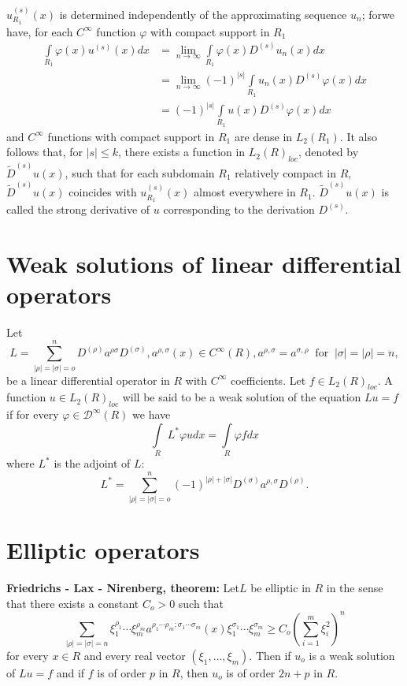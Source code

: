 $u^{(s)}_{R_1}(x)$ is determined independently of the approximating
sequence $u_n$; for\pageoriginale we have, for each $C^\infty$ function $\varphi$
with compact support in $R_1$ 
\begin{align*}
 \int\limits_{R_1} \varphi(x) u^{(s)} (x) dx & = \lim_{n \to \infty}
 \int\limits_{R_1} \varphi (x) D^{(s)} u_n (x) dx\\ 
 & = \lim_{n \to \infty} (-1)^{| s |} \int\limits_{R_1} u_n (x)
 D^{(s)} \varphi (x) dx\\ 
 & = (-1)^{|s|} \int\limits_{R_1} u(x) D^{(s)} \varphi (x) dx
\end{align*}
and $C^\infty$ functions with compact support in $R_1$ are dense in
$L_2(R_1)$. 
It also follows that, for $|s| \le k$, there exists a function in
$L_2(R)_{loc}$, denoted by $\tilde{D}^{(s)} u(x)$, such that for each
subdomain $R_1$ relatively compact in $R$, $\tilde{D}^{(s)} u(x)$ coincides
with $u^{(s)}_{R_1} (x)$ almost everywhere in $R_1$. $\tilde{D}^{(s)}
u(x)$ is called the strong derivative of $u$  corresponding to the
derivation $D^{(s)}$. 

\section{Weak solutions of linear differential operators}\label{chap13:sec2}

Let
$$
L = \sum^n_{| \rho | = | \sigma | = o} D^{(\rho)} a^{\rho \sigma}
D^{(\sigma)}, a^{\rho, \sigma} (x) \in C^\infty (R), a^{\rho, \sigma}
= a^{\sigma, \rho} ~\text{ for }~ | \sigma | = | \rho | = n, 
$$
 be a linear differential operator in $R$ with $C^\infty$
 coefficients. Let $f \in L_2 (R)_{loc}$. A function $u \in L_2
 (R)_{loc}$ will be said to be a weak solution of the equation $L u =
 f $ if for every $\varphi \in \mathscr{D}^\infty (R)$ we have 
 $$
 \int\limits_{R} ~ L^* \varphi u dx = \int\limits_{R} \varphi f dx
 $$
 where $L^*$ is the adjoint of $L$:
 $$
 L^* = \sum^n_{| \rho | = | \sigma | = o} (-1)^{|\rho | + |\sigma|}
 D^{(\sigma)} a^{\rho, \sigma} D^{(\rho)}. 
 $$

\section{Elliptic operators}\label{chap13:sec3} 

\noindent \textbf{Friedrichs - Lax - Nirenberg, theorem:}  
Let\pageoriginale $L$ be elliptic in $R$ in the sense that there
exists a constant $C_o > 0$ such that 
$$
\sum_{| \rho | = | \sigma | = n} \xi_1^{\rho_1} \cdots \xi_m^{\rho_m}
a^{\rho_1 \cdots \rho_m ; \sigma_1 \cdots \sigma_m} (x)
\xi_1^{\sigma_1} \cdots \xi_m^{\sigma_m} \ge C_o \left( \sum^m_{i = 1}
\xi^2_i \right)^ n 
$$
for every $x \in R$ and every real vector $(\xi_1, \ldots,
\xi_m)$. Then if $u_o$ is a weak solution of $Lu= f$ and if $f$ is of
order $p$ in $R$, then $u_o$ is of order $2n + p$ in $R$. 

